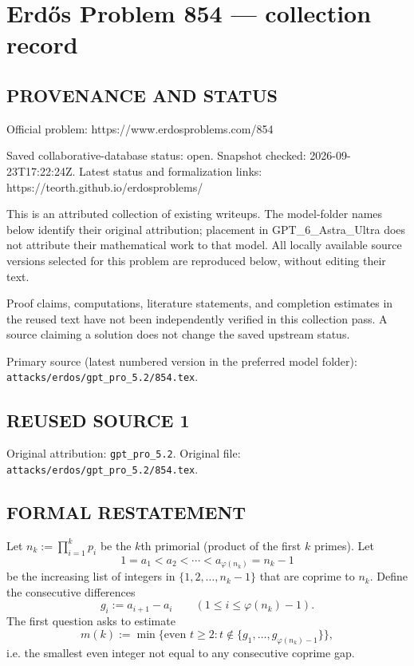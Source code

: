 \section*{Erd\H{o}s Problem 854 --- collection record}

\subsection*{PROVENANCE AND STATUS}
Official problem: https://www.erdosproblems.com/854

Saved collaborative-database status: open.
Snapshot checked: 2026-09-23T17:22:24Z.
Latest status and formalization links: https://teorth.github.io/erdosproblems/

This is an attributed collection of existing writeups. The model-folder names below identify their original attribution; placement in GPT\_6\_Astra\_Ultra does not attribute their mathematical work to that model. All locally available source versions selected for this problem are reproduced below, without editing their text.

Proof claims, computations, literature statements, and completion estimates in the reused text have not been independently verified in this collection pass. A source claiming a solution does not change the saved upstream status.

Primary source (latest numbered version in the preferred model folder): \texttt{attacks/erdos/gpt\_pro\_5.2/854.tex}.

\subsection*{REUSED SOURCE 1}
Original attribution: \texttt{gpt\_pro\_5.2}.
Original file: \texttt{attacks/erdos/gpt\_pro\_5.2/854.tex}.


\subsection*{FORMAL RESTATEMENT}
Let $n_k := \prod_{i=1}^k p_i$ be the $k$th primorial (product of the first $k$ primes). Let
\[
  1=a_1<a_2<\cdots<a_{\varphi(n_k)}=n_k-1
\]
be the increasing list of integers in $\{1,2,\dots,n_k-1\}$ that are coprime to $n_k$.
Define the consecutive differences
\[
  g_i := a_{i+1}-a_i \qquad (1\le i\le \varphi(n_k)-1).
\]
The first question asks to estimate
\[
  m(k):=\min\{\text{even }t\ge 2: t\notin\{g_1,\dots,g_{\varphi(n_k)-1}\}\},
\]
i.e. the smallest even integer not equal to any consecutive coprime gap.

